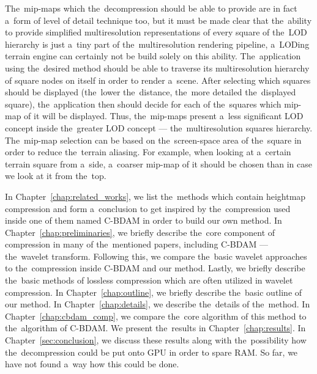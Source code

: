 The~mip-maps which the~decompression should be able to provide are in fact a~form of level of detail technique too, but it must be made clear that the~ability to provide simplified multiresolution representations of every square of the~LOD hierarchy is just a~tiny part of the~multiresolution rendering pipeline, a~LODing terrain engine can certainly not be build solely on this ability. The~application using the~desired method should be able to traverse its multiresolution hierarchy of square nodes on itself in order to render a~scene. After selecting which squares should be displayed (the~lower the~distance, the~more detailed the~displayed square), the~application then should decide for each of the~squares which mip-map of it will be displayed. Thus, the~mip-maps present a~less significant LOD concept inside the~greater LOD concept --- the~multiresolution squares hierarchy. The~mip-map selection can be based on the~screen-space area of the~square in order to reduce the~terrain aliasing. For example, when looking at a~certain terrain square from a~side, a~coarser mip-map of it should be chosen than in case we look at it from the~top.

In Chapter~\ref{chap:related_works}, we list the~methods which contain heightmap compression and form a~conclusion to get inspired by the~compression used inside one of them named C-BDAM in order to build our own method. In Chapter~\ref{chap:preliminaries}, we briefly describe the~core component of compression in many of the~mentioned papers, including C-BDAM --- the~wavelet transform. Following this, we compare the~basic wavelet approaches to the~compression inside C-BDAM and our method. Lastly, we briefly describe the~basic methods of lossless compression which are often utilized in wavelet compression. In Chapter~\ref{chap:outline}, we briefly describe the~basic outline of our method. In Chapter~\ref{chap:details}, we describe the~details of the~method. In Chapter~\ref{chap:cbdam_comp}, we compare the~core algorithm of this method to the~algorithm of C-BDAM. We present the~results in Chapter~\ref{chap:results}. In Chapter~\ref{sec:conclusion}, we discuss these results along with the~possibility how the~decompression could be put onto GPU in order to spare RAM. So far, we have not found a~way how this could be done.